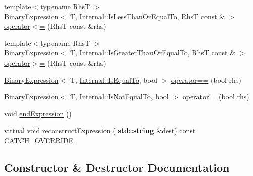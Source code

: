 \begin{DoxyCompactItemize}
\item 
{\footnotesize template$<$typename RhsT $>$ }\\\hyperlink{class_catch_1_1_binary_expression}{Binary\+Expression}$<$ T, \hyperlink{namespace_catch_1_1_internal_ae3f96598a7858155750bf38e7295d83ea0db29a4c3f1e81260036c5e27a8407fd}{Internal\+::\+Is\+Less\+Than\+Or\+Equal\+To}, RhsT const  \& $>$ \hyperlink{class_catch_1_1_expression_lhs_a1d10974a581c67cc400cd6cdd36b0000}{operator$<$=} (RhsT const \&rhs)
\item 
{\footnotesize template$<$typename RhsT $>$ }\\\hyperlink{class_catch_1_1_binary_expression}{Binary\+Expression}$<$ T, \hyperlink{namespace_catch_1_1_internal_ae3f96598a7858155750bf38e7295d83ead2de7e9565e59e36c0987e402203ce1c}{Internal\+::\+Is\+Greater\+Than\+Or\+Equal\+To}, RhsT const  \& $>$ \hyperlink{class_catch_1_1_expression_lhs_a3387a494cb6b699a6c0162c79f7f533c}{operator$>$=} (RhsT const \&rhs)
\item 
\hyperlink{class_catch_1_1_binary_expression}{Binary\+Expression}$<$ T, \hyperlink{namespace_catch_1_1_internal_ae3f96598a7858155750bf38e7295d83ea30e0accba6ec8384f4383b04dd2a6a9e}{Internal\+::\+Is\+Equal\+To}, bool $>$ \hyperlink{class_catch_1_1_expression_lhs_ab803185079504a65b0af95f7c9669351}{operator==} (bool rhs)
\item 
\hyperlink{class_catch_1_1_binary_expression}{Binary\+Expression}$<$ T, \hyperlink{namespace_catch_1_1_internal_ae3f96598a7858155750bf38e7295d83ea1e1699cf7d3dbee0908f1a123da2456d}{Internal\+::\+Is\+Not\+Equal\+To}, bool $>$ \hyperlink{class_catch_1_1_expression_lhs_a1f3ff934880623f12a4cbd9725397ccf}{operator!=} (bool rhs)
\item 
void \hyperlink{class_catch_1_1_expression_lhs_a13d2551a927790284fb5ddf1ee2c9079}{end\+Expression} ()
\item 
virtual void \hyperlink{class_catch_1_1_expression_lhs_a7684a053e8e88a4be475a536252630da}{reconstruct\+Expression} (\textbf{ std\+::string} \&dest) const \hyperlink{catch_8hpp_a8ecdce4d3f57835f707915ae831eb847}{C\+A\+T\+C\+H\+\_\+\+O\+V\+E\+R\+R\+I\+DE}
\end{DoxyCompactItemize}


\subsection{Constructor \& Destructor Documentation}
\mbox{\label{class_catch_1_1_expression_lhs_aa829588def6146a94fb75de9c4cc482a}} 
